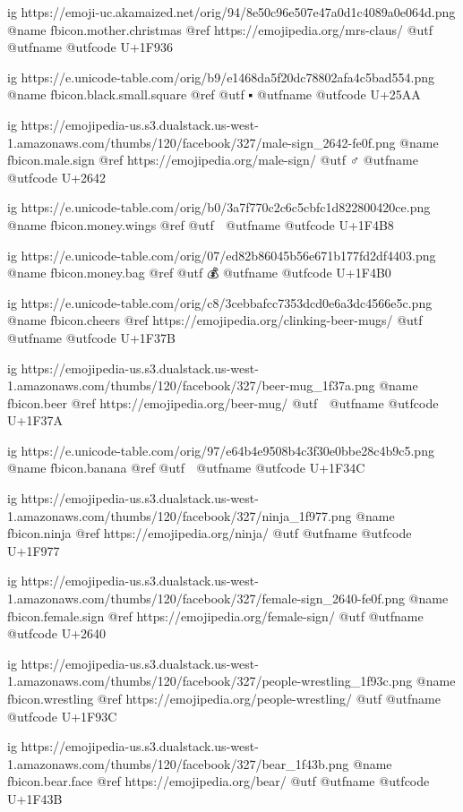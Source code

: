 	ig https://emoji-uc.akamaized.net/orig/94/8e50c96e507e47a0d1c4089a0e064d.png
	@name fbicon.mother.christmas
	@ref https://emojipedia.org/mrs-claus/
	@utf 🤶
	@utfname
	@utfcode U+1F936

	ig https://e.unicode-table.com/orig/b9/e1468da5f20dc78802afa4c5bad554.png
	@name fbicon.black.small.square
	@ref
	@utf ▪
	@utfname
	@utfcode U+25AA

	ig https://emojipedia-us.s3.dualstack.us-west-1.amazonaws.com/thumbs/120/facebook/327/male-sign_2642-fe0f.png
	@name fbicon.male.sign
	@ref https://emojipedia.org/male-sign/
	@utf ♂️
	@utfname
	@utfcode U+2642

	ig https://e.unicode-table.com/orig/b0/3a7f770c2c6c5cbfc1d822800420ce.png
	@name fbicon.money.wings
	@ref
	@utf 💸
	@utfname
	@utfcode U+1F4B8

	ig https://e.unicode-table.com/orig/07/ed82b86045b56e671b177fd2df4403.png
	@name fbicon.money.bag
	@ref
	@utf 💰
	@utfname
	@utfcode U+1F4B0

	ig https://e.unicode-table.com/orig/c8/3cebbafcc7353dcd0e6a3dc4566e5c.png
	@name fbicon.cheers
	@ref https://emojipedia.org/clinking-beer-mugs/
	@utf 🍻
	@utfname
	@utfcode U+1F37B

	ig https://emojipedia-us.s3.dualstack.us-west-1.amazonaws.com/thumbs/120/facebook/327/beer-mug_1f37a.png
	@name fbicon.beer
	@ref https://emojipedia.org/beer-mug/
	@utf 🍺
	@utfname
	@utfcode U+1F37A

	ig https://e.unicode-table.com/orig/97/e64b4e9508b4c3f30e0bbe28c4b9c5.png
	@name fbicon.banana
	@ref
	@utf 🍌
	@utfname
	@utfcode U+1F34C

	ig https://emojipedia-us.s3.dualstack.us-west-1.amazonaws.com/thumbs/120/facebook/327/ninja_1f977.png
	@name fbicon.ninja
	@ref https://emojipedia.org/ninja/
	@utf
	@utfname
	@utfcode U+1F977

	ig https://emojipedia-us.s3.dualstack.us-west-1.amazonaws.com/thumbs/120/facebook/327/female-sign_2640-fe0f.png
	@name fbicon.female.sign
	@ref https://emojipedia.org/female-sign/
	@utf
	@utfname
	@utfcode U+2640

	ig https://emojipedia-us.s3.dualstack.us-west-1.amazonaws.com/thumbs/120/facebook/327/people-wrestling_1f93c.png
	@name fbicon.wrestling
	@ref https://emojipedia.org/people-wrestling/
	@utf
	@utfname
	@utfcode U+1F93C

	ig https://emojipedia-us.s3.dualstack.us-west-1.amazonaws.com/thumbs/120/facebook/327/bear_1f43b.png
	@name fbicon.bear.face
	@ref https://emojipedia.org/bear/
	@utf
	@utfname
	@utfcode U+1F43B

